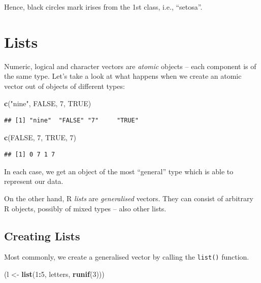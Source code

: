 \documentclass[10pt,b5paper,krantz1]{krantz}
\newenvironment{Shaded}{\begin{snugshade}}{\end{snugshade}}
\newcommand{\DecValTok}[1]{\textcolor[rgb]{0.06,0.06,0.06}{#1}}
\newcommand{\KeywordTok}[1]{\textcolor[rgb]{0.27,0.27,0.27}{\textbf{#1}}}
\newcommand{\NormalTok}[1]{#1}
\newcommand{\OperatorTok}[1]{\textcolor[rgb]{0.43,0.43,0.43}{\textbf{#1}}}
\newcommand{\OtherTok}[1]{\textcolor[rgb]{0.37,0.37,0.37}{#1}}
\newcommand{\StringTok}[1]{\textcolor[rgb]{0.5,0.5,0.5}{#1}}
\begin{document}
Hence, black circles mark irises from the 1st class, i.e., ``setosa''.

\hypertarget{lists}{%
\section{Lists}\label{lists}}

Numeric, logical and character vectors are \emph{atomic} objects -- each
component is of the same type. Let's take a look at what happens when
we create an atomic vector out of objects of different types:

\begin{Shaded}
\begin{Highlighting}[]
\KeywordTok{c}\NormalTok{(}\StringTok{"nine"}\NormalTok{, }\OtherTok{FALSE}\NormalTok{, }\DecValTok{7}\NormalTok{, }\OtherTok{TRUE}\NormalTok{)}
\end{Highlighting}
\end{Shaded}

\begin{verbatim}
## [1] "nine"  "FALSE" "7"     "TRUE"
\end{verbatim}

\begin{Shaded}
\begin{Highlighting}[]
\KeywordTok{c}\NormalTok{(}\OtherTok{FALSE}\NormalTok{, }\DecValTok{7}\NormalTok{, }\OtherTok{TRUE}\NormalTok{, }\DecValTok{7}\NormalTok{)}
\end{Highlighting}
\end{Shaded}

\begin{verbatim}
## [1] 0 7 1 7
\end{verbatim}

In each case, we get an object of the most ``general'' type which is able to
represent our data.

On the other hand, R \emph{lists} are \emph{generalised} vectors.
They can consist of arbitrary R objects, possibly of mixed types --
also other lists.

\hypertarget{creating-lists}{%
\subsection{Creating Lists}\label{creating-lists}}

Most commonly, we create a generalised vector by calling the \texttt{list()} function.

\begin{Shaded}
\begin{Highlighting}[]
\NormalTok{(l <-}\StringTok{ }\KeywordTok{list}\NormalTok{(}\DecValTok{1}\OperatorTok{:}\DecValTok{5}\NormalTok{, letters, }\KeywordTok{runif}\NormalTok{(}\DecValTok{3}\NormalTok{)))}
\end{Highlighting}
\end{Shaded}
\end{document}
